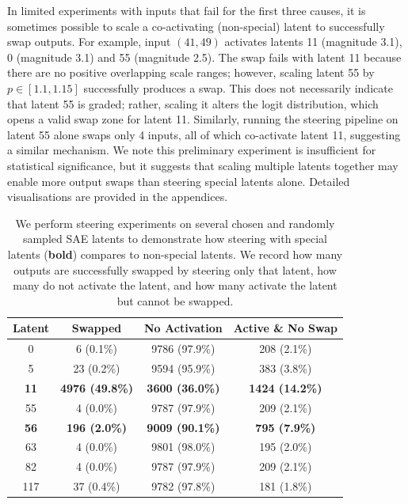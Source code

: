 In limited experiments with inputs that fail for the first three causes, it is sometimes possible to scale a co-activating (non-special) latent to successfully swap outputs. For example, input $(41,49)$ activates latents 11 (magnitude 3.1), 0 (magnitude 3.1) and 55 (magnitude 2.5). The swap fails with latent 11 because there are no positive overlapping scale ranges; however, scaling latent 55 by $p \in [1.1, 1.15]$ successfully produces a swap. This does not necessarily indicate that latent 55 is graded; rather, scaling it alters the logit distribution, which opens a valid swap zone for latent 11. Similarly, running the steering pipeline on latent 55 alone swaps only 4 inputs, all of which co-activate latent 11, suggesting a similar mechanism. We note this preliminary experiment is insufficient for statistical significance, but it suggests that scaling multiple latents together may enable more output swaps than steering special latents alone. Detailed visualisations are provided in the appendices.

\begin{table}[ht]
\centering
\caption{We perform steering experiments on several chosen and randomly sampled SAE latents to demonstrate how steering with special latents (\textbf{bold}) compares to non-special latents. We record how many outputs are successfully swapped by steering only that latent, how many do not activate the latent, and how many activate the latent but cannot be swapped.}
\label{tab:latent_swap_metrics}
\vspace{0.5em}
\setlength{\tabcolsep}{3pt}
\begin{tabular}{@{}cccc@{}}
\toprule
\textbf{Latent} & \textbf{Swapped} & \textbf{No Activation} & \textbf{Active \& No Swap} \\
\midrule
0   & 6 (0.1\%)  & 9786 (97.9\%) & 208 (2.1\%)  \\
5   & 23 (0.2\%)  & 9594 (95.9\%) & 383 (3.8\%)  \\
\textbf{11}  & \textbf{4976 (49.8\%)} & \textbf{3600 (36.0\%)} & \textbf{1424 (14.2\%)} \\
55  & 4 (0.0\%)  & 9787 (97.9\%) & 209 (2.1\%)  \\
\textbf{56}  & \textbf{196 (2.0\%)}  & \textbf{9009 (90.1\%)} & \textbf{795 (7.9\%)}  \\
63  & 4 (0.0\%)  & 9801 (98.0\%) & 195 (2.0\%)  \\
82  & 4 (0.0\%)  & 9787 (97.9\%) & 209 (2.1\%)  \\
117 & 37 (0.4\%)  & 9782 (97.8\%) & 181 (1.8\%)  \\
\bottomrule
\end{tabular}
\end{table}

